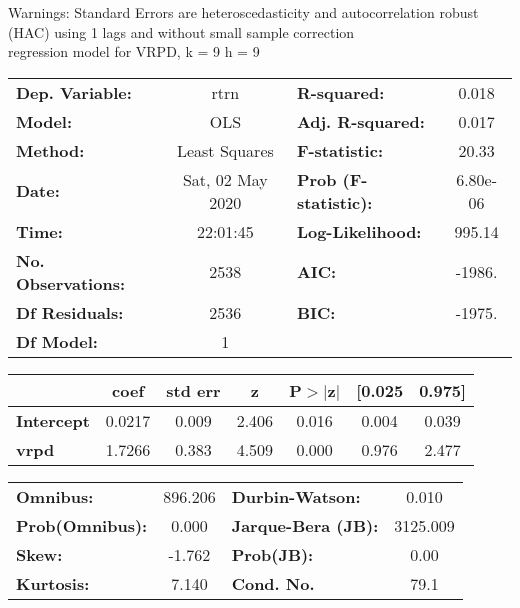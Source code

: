 Warnings: \newline
 [1] Standard Errors are heteroscedasticity and autocorrelation robust (HAC) using 1 lags and without small sample correction\\ 

regression model for VRPD, k = 9 h = 9\begin{center}
\begin{tabular}{lclc}
\toprule
\textbf{Dep. Variable:}    &       rtrn       & \textbf{  R-squared:         } &     0.018   \\
\textbf{Model:}            &       OLS        & \textbf{  Adj. R-squared:    } &     0.017   \\
\textbf{Method:}           &  Least Squares   & \textbf{  F-statistic:       } &     20.33   \\
\textbf{Date:}             & Sat, 02 May 2020 & \textbf{  Prob (F-statistic):} &  6.80e-06   \\
\textbf{Time:}             &     22:01:45     & \textbf{  Log-Likelihood:    } &    995.14   \\
\textbf{No. Observations:} &        2538      & \textbf{  AIC:               } &    -1986.   \\
\textbf{Df Residuals:}     &        2536      & \textbf{  BIC:               } &    -1975.   \\
\textbf{Df Model:}         &           1      & \textbf{                     } &             \\
\bottomrule
\end{tabular}
\begin{tabular}{lcccccc}
                   & \textbf{coef} & \textbf{std err} & \textbf{z} & \textbf{P$> |$z$|$} & \textbf{[0.025} & \textbf{0.975]}  \\
\midrule
\textbf{Intercept} &       0.0217  &        0.009     &     2.406  &         0.016        &        0.004    &        0.039     \\
\textbf{vrpd}      &       1.7266  &        0.383     &     4.509  &         0.000        &        0.976    &        2.477     \\
\bottomrule
\end{tabular}
\begin{tabular}{lclc}
\textbf{Omnibus:}       & 896.206 & \textbf{  Durbin-Watson:     } &    0.010  \\
\textbf{Prob(Omnibus):} &   0.000 & \textbf{  Jarque-Bera (JB):  } & 3125.009  \\
\textbf{Skew:}          &  -1.762 & \textbf{  Prob(JB):          } &     0.00  \\
\textbf{Kurtosis:}      &   7.140 & \textbf{  Cond. No.          } &     79.1  \\
\bottomrule
\end{tabular}
\end{center}

